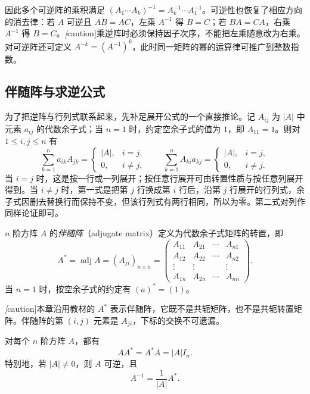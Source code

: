 因此多个可逆阵的乘积满足 $(A_1\cdots A_k)^{-1}=A_k^{-1}\cdots A_1^{-1}$。可逆性也恢复了相应方向的消去律：若 $A$ 可逆且 $AB=AC$，左乘 $A^{-1}$ 得 $B=C$；若 $BA=CA$，右乘 $A^{-1}$ 得 $B=C$。\emph[caution]{乘逆阵时必须保持因子次序，不能把左乘随意改为右乘。}对可逆阵还可定义 $A^{-k}=(A^{-1})^k$，此时同一矩阵的幂的运算律可推广到整数指数。

\subsection{伴随阵与求逆公式}

为了把逆阵与行列式联系起来，先补足展开公式的一个直接推论。记 $A_{ij}$ 为 $|A|$ 中元素 $a_{ij}$ 的代数余子式；当 $n=1$ 时，约定空余子式的值为 $1$，即 $A_{11}=1$。则对 $1\leq i,j\leq n$ 有
\begin{equation}
\label{eq:matrix-cofactor-orthogonality}
    \sum_{k=1}^{n}a_{ik}A_{jk}
    =\begin{cases}|A|,&i=j,\\0,&i\ne j,\end{cases}
    \qquad
    \sum_{k=1}^{n}A_{ki}a_{kj}
    =\begin{cases}|A|,&i=j,\\0,&i\ne j.\end{cases}
\end{equation}
当 $i=j$ 时，这是按一行或一列展开；按任意行展开可由转置性质与按任意列展开得到。当 $i\ne j$ 时，第一式是把第 $j$ 行换成第 $i$ 行后，沿第 $j$ 行展开的行列式，余子式因删去替换行而保持不变，但该行列式有两行相同，所以为零。第二式对列作同样论证即可。

\begin{definition}
\label{def:matrix-adjugate}
$n$ 阶方阵 $A$ 的\emph{伴随阵}（adjugate matrix）定义为代数余子式矩阵的转置，即
\[
    A^*=\operatorname{adj}A=(A_{ji})_{n\times n}
    =\begin{pmatrix}
        A_{11}&A_{21}&\cdots&A_{n1}\\
        A_{12}&A_{22}&\cdots&A_{n2}\\
        \vdots&\vdots&&\vdots\\
        A_{1n}&A_{2n}&\cdots&A_{nn}
    \end{pmatrix}.
\]
当 $n=1$ 时，按空余子式的约定有 $(a)^*=(1)$。
\end{definition}

\emph[caution]{本章沿用教材的 $A^*$ 表示伴随阵，它既不是共轭矩阵，也不是共轭转置矩阵。}伴随阵的第 $(i,j)$ 元素是 $A_{ji}$，下标的交换不可遗漏。

\begin{theorem}[伴随阵恒等式与求逆]
\label{thm:matrix-adjugate-inverse}
对每个 $n$ 阶方阵 $A$，都有
\begin{equation}
\label{eq:matrix-adjugate-identity}
    AA^*=A^*A=|A|I_n.
\end{equation}
特别地，若 $|A|\ne0$，则 $A$ 可逆，且
\begin{equation}
\label{eq:matrix-adjugate-inverse}
    A^{-1}=\frac{1}{|A|}A^*.
\end{equation}
\end{theorem}

